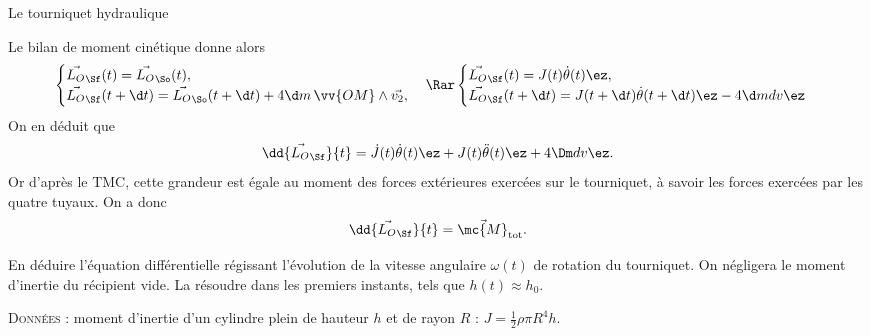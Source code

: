 \begin{exo}[PC][3][TD]{Le tourniquet hydraulique}
\begin{quest}
{\begin{liste}
	\end{liste}
	Le bilan de moment cinétique donne alors
	\begin{equation*}
	\begin{cases}
	\Vec{L_O}_{\Sf}(t)=\Vec{L_O}_{\So}(t),\\
	\Vec{L_O}_{\Sf}(t+\d t)=\Vec{L_O}_{\So}(t+\d t)+ 4\d m \,\vv{OM} \wedge \Vec{v_2},
	\end{cases}
	\Rar 
	\begin{cases}
	\Vec{L_O}_{\Sf}(t) = J(t) \dot{\theta}(t) \ez,\\
	\Vec{L_O}_{\Sf}(t+\d t) = J(t+\d t) \dot{\theta}(t+\d t) \ez - 4 \d m d v \ez
	\end{cases}
	\end{equation*}
	On en déduit que 
	$$
	\dd{\Vec{L_O}_{\Sf}}{t} = \dot{J}(t) \dot{\theta}(t) \ez + J(t) \ddot{\theta}(t) \ez + 4 \Dm d v \ez.
	$$
	Or d'après le TMC, cette grandeur est égale au moment des forces extérieures exercées sur le tourniquet, à savoir les forces exercées par les quatre tuyaux. On a donc
	$$
	\dd{\Vec{L_O}_{\Sf}}{t} = \Vec{\mc{M}}_{\rm{tot}}.
	$$
	}
	
	\item 
	En déduire l'équation différentielle régissant l'évolution de la vitesse angulaire $\omega(t)$ de rotation du tourniquet. On négligera le moment d'inertie du récipient vide. La résoudre dans les premiers instants, tels que $h(t) \approx h_0$.
	
	\textsc{Données} : moment d'inertie d'un cylindre plein de hauteur $h$ et de rayon $R$ : $J = \frac{1}{2} \rho \pi R^4 h$.
	
	

	
\end{quest}

\end{exo}

